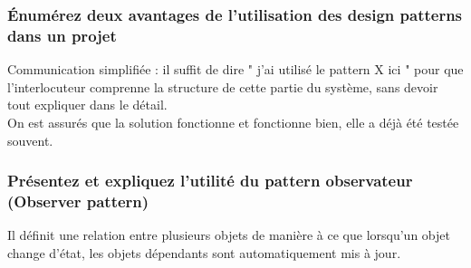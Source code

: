 \subsubsection{Énumérez deux avantages de l'utilisation des design patterns dans un projet}
\textcolor[rgb]{0,0.48,0.58}{Communication simplifiée : il suffit de dire " j’ai utilisé le pattern X ici " pour que l’interlocuteur comprenne la structure de cette partie du système, sans devoir tout expliquer dans le détail.
\\On est assurés que la solution fonctionne et fonctionne bien, elle a déjà été testée souvent.}



\subsubsection{Présentez et expliquez l’utilité du pattern observateur (Observer pattern)}
\textcolor[rgb]{0,0.48,0.58}{Il définit une relation entre plusieurs objets de manière à ce que lorsqu’un objet change d’état, les objets dépendants sont automatiquement mis à jour.}